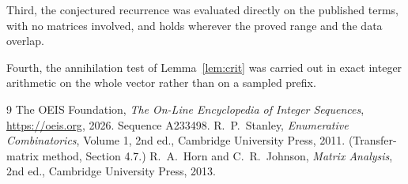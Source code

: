 \documentclass[11pt,a4paper]{article}
\theoremstyle{plain}
\theoremstyle{definition}
\begin{document}
Third, the conjectured recurrence was evaluated directly on the published terms, with no
matrices involved, and holds wherever the proved range and the data overlap.

Fourth, the annihilation test of Lemma~\ref{lem:crit} was carried out in exact integer
arithmetic on the whole vector rather than on a sampled prefix.

\begin{thebibliography}{9}
 The OEIS Foundation, \emph{The On-Line Encyclopedia of Integer
Sequences}, \url{https://oeis.org}, 2026. Sequence A233498.
 R.~P.~Stanley, \emph{Enumerative Combinatorics}, Volume 1, 2nd ed.,
Cambridge University Press, 2011. (Transfer-matrix method, Section 4.7.)
 R.~A.~Horn and C.~R.~Johnson, \emph{Matrix Analysis}, 2nd ed., Cambridge
University Press, 2013.
\end{thebibliography}
\end{document}
